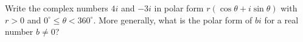Write the complex numbers $4i$ and $-3i$ in polar form $r(\cos\theta+i\sin\theta)$ with $r>0$ and $0^\circ\le\theta<360^\circ$. More generally, what is the polar form of $bi$ for a real number $b\ne0$?
